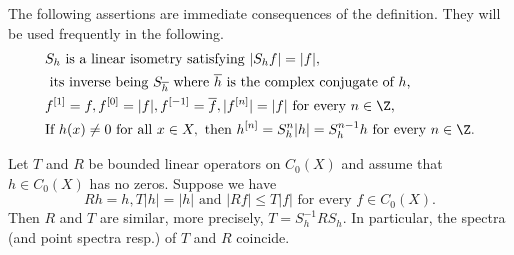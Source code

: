 The following assertions are immediate consequences of the definition. They will be used frequently in the following.
\begin{align}
&S_{h} \text{  is a linear isometry satisfying  } |S_{h}f| = |f|,\\ 
&\text{  its inverse being  } S_{\overline{h}} \text{  where  } \overline{h} \text{ is the complex conjugate of $ h $,} \\
&f^{[1]} = f, f^{[0]} = |f|, f^{[-1]} = \overline{f}, |f^{[n]}| = |f| \text{  for every $n \in \Z$, }\\ 
&\text{If  } h(x) \neq 0 \text{  for all  } x \in X, \text{  then  } h^{[n]} = S_{h}^{n}|h| = S_{h}^{n-1}h
	\text{  for every $ n \in \Z $.} 
\end{align}
\begin{lemma}\label{lem:b3-2.3}
Let $T$ and $R$ be bounded linear operators on $C_{0}(X)$ and assume that $h \in C_{0}(X)$ has no zeros. Suppose we have
\begin{equation}\label{eq:lem-b3-2.3}
	Rh = h, T|h| = |h| \text{ and } |Rf| \leq T|f| \text{ for every $f \in C_{0}(X)$.} 
\end{equation}
Then $R$ and $T$ are similar, more precisely, $T = S_{h}^{-1}RS_{h}$.
In particular, the spectra (and point spectra resp.) of $T$ and $R$ coincide.
\end{lemma}
